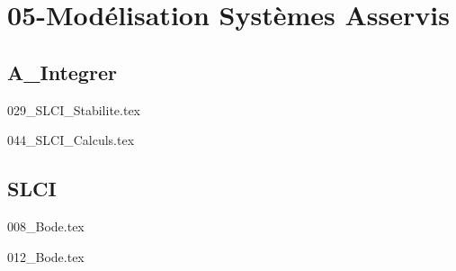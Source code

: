 \clearpage
\chapter{05-Modélisation Systèmes Asservis}

\section{A\_Integrer}

\setcounter{question}{0}
{}
\graphicspath{{../05-Modélisation Systèmes Asservis/TD/A_Integrer/DDS_02/029_SLCI_Stabilite/images/}{../05-Modélisation Systèmes Asservis/TD/A_Integrer/DDS_02/029_SLCI_Stabilite/}{../Style/png/}}
{029_SLCI_Stabilite.tex}

\setcounter{question}{0}
{}
\graphicspath{{../05-Modélisation Systèmes Asservis/TD/A_Integrer/DDS_03/044_SLCI_Calculs/images/}{../05-Modélisation Systèmes Asservis/TD/A_Integrer/DDS_03/044_SLCI_Calculs/}{../Style/png/}}
{044_SLCI_Calculs.tex}

\section{SLCI}

\setcounter{question}{0}
{}
\graphicspath{{../05-Modélisation Systèmes Asservis/TD/SLCI/Bode/008_Bode/images/}{../05-Modélisation Systèmes Asservis/TD/SLCI/Bode/008_Bode/}{../Style/png/}}
{008_Bode.tex}

\setcounter{question}{0}
{}
\graphicspath{{../05-Modélisation Systèmes Asservis/TD/SLCI/Bode/012_Bode/images/}{../05-Modélisation Systèmes Asservis/TD/SLCI/Bode/012_Bode/}{../Style/png/}}
{012_Bode.tex}

